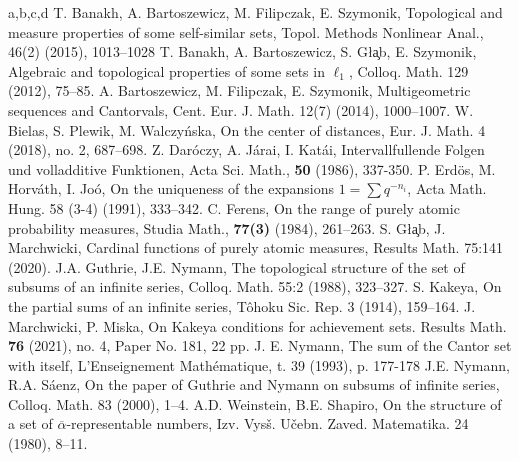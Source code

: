 \documentclass{amsart}
\theoremstyle{definition}
\begin{document}
\begin{thebibliography}{a,b,c,d}
 T. Banakh, A. Bartoszewicz, M. Filipczak, E. Szymonik, Topological and measure properties of some self-similar sets, Topol. Methods Nonlinear Anal., 46(2) (2015), 1013--1028
 T. Banakh, A. Bartoszewicz, S. G\l \c{a}b, E. Szymonik,  Algebraic and topological properties of some sets in $\ell_1$, Colloq. Math. 129 (2012), 75--85. 
 A. Bartoszewicz, M. Filipczak, E. Szymonik, Multigeometric sequences and Cantorvals, Cent. Eur. J. Math. 12(7) (2014), 1000--1007.
  W. Bielas, S. Plewik, M. Walczy\'nska, On the center of distances, Eur. J. Math. 4 (2018), no. 2, 687--698.
 Z. Dar\'oczy, A. J\'arai, I. Kat\'ai, Intervallfullende Folgen und volladditive Funktionen, Acta Sci. Math., \textbf{50} (1986), 337-350.
 P. Erd\"os, M. Horv\'ath, I. Jo\'o, On the uniqueness of the expansions $1=\sum q^{-n_i}$, Acta Math. Hung. 58 (3-4) (1991), 333--342.
 C. Ferens, On the range of purely atomic probability
measures, Studia Math., \textbf{77(3)} (1984), 261--263.
 S. G\l\c{a}b, J. Marchwicki, Cardinal functions of purely atomic measures, Results Math. 75:141 (2020).
 J.A. Guthrie, J.E. Nymann, The topological structure of the set of subsums of an infinite series, Colloq. Math. 55:2 (1988), 323--327.
 S. Kakeya, On the partial sums of an infinite series, T\^{o}hoku Sic. Rep. 3 (1914), 159--164.
 J. Marchwicki, P. Miska, On Kakeya conditions for achievement sets. Results Math. \textbf{76} (2021), no. 4, Paper No. 181, 22 pp.
 J. E. Nymann, The sum of the Cantor set with itself, L'Enseignement Math\'ematique, t. 39 (1993), p. 177-178
 J.E. Nymann, R.A. S\'{a}enz, On the paper of Guthrie and Nymann on subsums of infinite series, Colloq. Math. 83 (2000), 1--4.  
 A.D. Weinstein, B.E. Shapiro, On the structure of a set of $\overline{\alpha}$-representable numbers, Izv. Vys\v{s}. U\v{c}ebn. Zaved. Matematika. 24 (1980), 8--11. 
\end{thebibliography}
\end{document}
